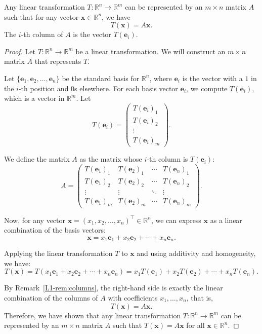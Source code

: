 \begin{theorem}\label{L1-thm:matrix}
    Any linear transformation $T: \mathbb{R}^n \to \mathbb{R}^m$ can be represented by an $m \times n$ matrix $A$ such that for any vector $\mathbf{x} \in \mathbb{R}^n$, we have
    \[T(\mathbf{x}) = A\mathbf{x}.\]
    The $i$-th column of $A$ is the vector $T(\mathbf{e}_i)$.
\end{theorem}

\begin{proof}
    Let $T: \mathbb{R}^n \to \mathbb{R}^m$ be a linear transformation. We will construct an $m \times n$ matrix $A$ that represents $T$.

    Let $\{\mathbf{e}_1, \mathbf{e}_2, \ldots, \mathbf{e}_n\}$ be the standard basis for $\mathbb{R}^n$, where $\mathbf{e}_i$ is the vector with a $1$ in the $i$-th position and $0$s elsewhere. For each basis vector $\mathbf{e}_i$, we compute $T(\mathbf{e}_i)$, which is a vector in $\mathbb{R}^m$. Let
    \[T(\mathbf{e}_i) = \begin{pmatrix}
        T(\mathbf{e}_i)_1 \\
        T(\mathbf{e}_i)_2 \\
        \vdots \\
        T(\mathbf{e}_i)_m
    \end{pmatrix}.\]

    We define the matrix $A$ as the matrix whose $i$-th column is $T(\mathbf{e}_i)$:
    \[A = \begin{pmatrix}
        T(\mathbf{e}_1)_1 & T(\mathbf{e}_2)_1 & \cdots & T(\mathbf{e}_n)_1 \\
        T(\mathbf{e}_1)_2 & T(\mathbf{e}_2)_2 & \cdots & T(\mathbf{e}_n)_2 \\
        \vdots & \vdots & \ddots & \vdots \\
        T(\mathbf{e}_1)_m & T(\mathbf{e}_2)_m & \cdots & T(\mathbf{e}_n)_m
    \end{pmatrix}.\]

    Now, for any vector $\mathbf{x} = (x_1, x_2, \ldots, x_n)^\top \in \mathbb{R}^n$, we can express $\mathbf{x}$ as a linear combination of the basis vectors:
    \[\mathbf{x} = x_1 \mathbf{e}_1 + x_2 \mathbf{e}_2 + \cdots + x_n \mathbf{e}_n.\]

    Applying the linear transformation $T$ to $\mathbf{x}$ and using additivity and homogeneity, we have:
    \[T(\mathbf{x}) = T(x_1 \mathbf{e}_1 + x_2 \mathbf{e}_2 + \cdots + x_n \mathbf{e}_n) = x_1 T(\mathbf{e}_1) + x_2 T(\mathbf{e}_2) + \cdots + x_n T(\mathbf{e}_n).\]

    By Remark~\ref{L1-rem:columns}, the right-hand side is exactly the linear combination of the columns of $A$ with coefficients $x_1, \ldots, x_n$, that is,
    \[T(\mathbf{x}) = A \mathbf{x}.\]
    Therefore, we have shown that any linear transformation $T: \mathbb{R}^n \to \mathbb{R}^m$ can be represented by an $m \times n$ matrix $A$ such that $T(\mathbf{x}) = A\mathbf{x}$ for all $\mathbf{x} \in \mathbb{R}^n$.
\end{proof}

